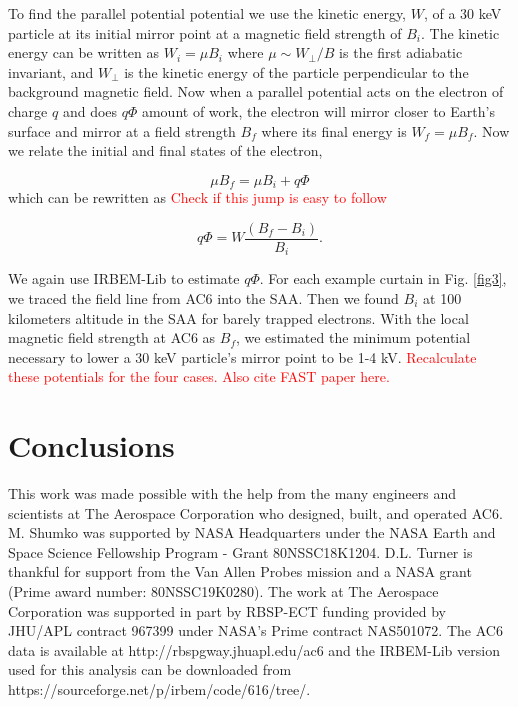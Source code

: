 \documentclass[draft]{agujournal2019}
\begin{document}
To find the parallel potential potential we use the kinetic energy, $W$, of a $30$ keV particle at its initial mirror point at a magnetic field strength of $B_i$. The kinetic energy can be written as $W_i = \mu B_i$ where $\mu \sim W_\perp / B$ is the first adiabatic invariant, and $W_{\perp}$ is the kinetic energy of the particle perpendicular to the background magnetic field. Now when a parallel potential acts on the electron of charge $q$ and does $q \Phi$ amount of work, the electron will mirror closer to Earth's surface and mirror at a field strength $B_f$ where its final energy is $W_f = \mu B_f$. Now we relate the initial and final states of the electron,

\begin{equation}
\mu B_f = \mu B_i + q \Phi
\end{equation} which can be rewritten as \textcolor{red}{Check if this jump is easy to follow}

\begin{equation}
 q \Phi = W \frac{(B_f - B_i)}{B_i}.
\end{equation}

We again use IRBEM-Lib to estimate $ q \Phi$. For each example curtain in Fig. \ref{fig3}, we traced the field line from AC6 into the SAA. Then we found $B_i$ at 100 kilometers altitude in the SAA for barely trapped electrons. With the local magnetic field strength at AC6 as $B_f$, we estimated the minimum potential necessary to lower a $30$ keV particle's mirror point to be 1-4 kV. \textcolor{red}{Recalculate these potentials for the four cases. Also cite FAST paper here.}


\section{Conclusions}


\acknowledgments
This work was made possible with the help from the many engineers and scientists at The Aerospace Corporation who designed, built, and operated AC6. M. Shumko was supported by NASA Headquarters under the NASA Earth and Space Science Fellowship Program - Grant 80NSSC18K1204. D.L. Turner is thankful for support from the Van Allen Probes mission and a NASA grant (Prime award number: 80NSSC19K0280). The work at The Aerospace Corporation was supported in part by RBSP-ECT funding provided by JHU/APL contract 967399 under NASA's Prime contract NAS501072. The AC6 data is available at http://rbspgway.jhuapl.edu/ac6 and the IRBEM-Lib version used for this analysis can be downloaded from https://sourceforge.net/p/irbem/code/616/tree/.
\end{document}
